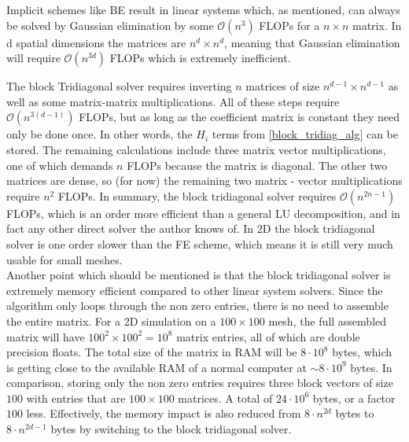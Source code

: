 Implicit schemes like BE result in linear systems which, as mentioned, can always be solved by Gaussian elimination by some $\mathcal O(n^3)$ FLOPs for a $n\times n$ matrix. 
In d spatial dimensions the matrices are $n^d\times n^d$, meaning that Gaussian elimination will require $\mathcal{O}(n^{3d})$ FLOPs which is extremely inefficient. 


The block Tridiagonal solver requires inverting $n$ matrices of size $n^{d-1}\times n^{d-1}$ as well as some matrix-matrix multiplications. 
All of these steps require $\mathcal O(n^{3(d-1)})$ FLOPs, but as long as the coefficient matrix is constant they need only be done once. 
In other words, the $H_i$ terms from \eqref{block_tridiag_alg} can be stored. 
The remaining calculations include three matrix vector multiplications, one of which demands $n$ FLOPs because the matrix is diagonal. 
The other two matrices are dense, so (for now) the remaining two matrix - vector multiplications require $n^2$ FLOPs. 
In summary, the block tridiagonal solver requires $\mathcal{O}(n^{2n-1})$ FLOPs, which is an order more efficient than a general LU decomposition, and in fact any other direct solver the author knows of. 
In 2D the block tridiagonal solver is one order slower than the FE scheme, which means it is still very much usable for small meshes. \\

Another point which should be mentioned is that the block tridiagonal solver is extremely memory efficient compared to other linear system solvers. 
Since the algorithm only loops through the non zero entries, there is no need to assemble the entire matrix. 
For a 2D simulation on a $100\times 100$ mesh, the full assembled matrix will have $100^2\times100^2 = 10^8$ matrix entries, all of which are double precision floats. 
The total size of the matrix in RAM will be $8\cdot10^8$ bytes, which is getting close to the available RAM of a normal computer at  $\sim 8\cdot10^9$ bytes. 
In comparison, storing only the non zero entries requires three block vectors of size $100$ with entries that are $100\times100$ matrices. A total of $24\cdot10^6$ bytes, or a factor $100$ less. 
Effectively, the memory impact is also reduced from $8\cdot n^{2d}$ bytes to $8\cdot n^{2d-1}$ bytes by switching to the block tridiagonal solver. 


